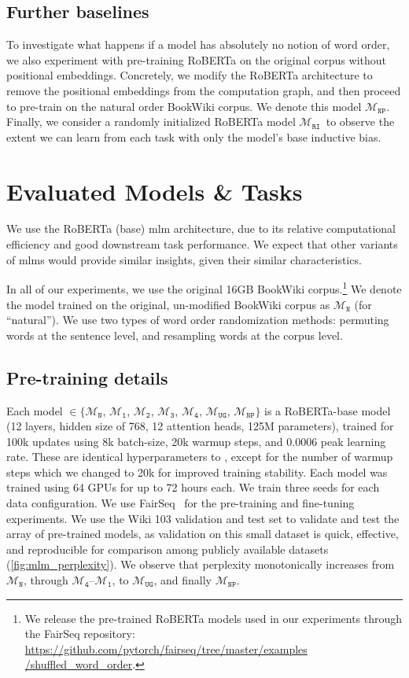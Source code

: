\documentclass[letterpaper, 12pt]{report}
\newcommand{\OR}{$\mathcal{M}_{\texttt{N}}$}
\newcommand{\RI}{$\mathcal{M}_{\texttt{1}}$}
\newcommand{\RII}{$\mathcal{M}_{\texttt{2}}$}
\newcommand{\RIII}{$\mathcal{M}_{\texttt{3}}$}
\newcommand{\RIV}{$\mathcal{M}_{\texttt{4}}$}
\newcommand{\RC}{$\mathcal{M}_{\texttt{UG}}$}
\newcommand{\RT}{$\mathcal{M}_{\texttt{RI}}$}
\newcommand{\NP}{$\mathcal{M}_{\texttt{NP}}$}
\begin{document}
\subsection{Further baselines}

To investigate what happens if a model has absolutely no notion of word order, we also experiment with pre-training RoBERTa on the original corpus without positional embeddings.
Concretely, we modify the RoBERTa architecture to remove the positional embeddings from the computation graph, and then proceed to pre-train on the natural order BookWiki corpus.
We denote this model \NP.
Finally, we consider a randomly initialized RoBERTa model \RT\, to observe the extent we can learn from each task with only the model's base inductive bias.

\section{Evaluated Models \& Tasks}
\label{sec:mlm_evaluated_models}

We use the RoBERTa (base) \cite{liu2019b} \acrshort{mlm} architecture, due to its relative computational efficiency and good downstream task performance. We expect that other variants of \acrshort{mlm}s would provide similar insights, given their similar characteristics.

In all of our experiments, we use the original 16GB BookWiki corpus.\footnote{We release the pre-trained RoBERTa models used in our experiments through the FairSeq repository:  \href{https://github.com/pytorch/fairseq/tree/master/examples/shuffled_word_order}{https://github.com/pytorch/fairseq/tree/master/examples /shuffled\_word\_order}.} We denote the model trained on the original, un-modified BookWiki corpus as \OR{} (for ``natural''). We use two types of word order randomization methods: permuting words at the sentence level, and resampling words at the corpus level.


\subsection{Pre-training details}

Each model $\in \{$\OR, \RI, \RII, \RIII, \RIV, \RC, \NP$\}$ is a RoBERTa-base model (12 layers, hidden size of 768, 12 attention heads, 125M parameters), trained for 100k updates using 8k batch-size, 20k warmup steps, and 0.0006 peak learning rate. These are identical hyperparameters to \cite{liu2019b}, except for the number of warmup steps which we changed to 20k for improved training stability. Each model was trained using 64 GPUs for up to 72 hours each. We train three seeds for each data configuration. We use FairSeq~\cite{ott2019fairseq} for the pre-training and fine-tuning experiments.
We use the Wiki 103 validation and test set to validate and test the array of pre-trained models, as validation on this small dataset is quick, effective, and reproducible for comparison among publicly available datasets (\autoref{fig:mlm_perplexity}). We observe that perplexity monotonically increases from \OR, through \RIV--\RI, to \RC, and finally \NP.
\end{document}
